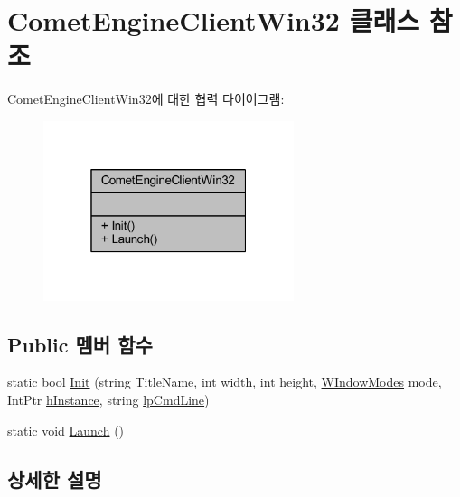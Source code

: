 \hypertarget{class_comet_engine_1_1_client_1_1_comet_engine_client_win32}{}\section{Comet\+Engine\+Client\+Win32 클래스 참조}
\label{class_comet_engine_1_1_client_1_1_comet_engine_client_win32}


Comet\+Engine\+Client\+Win32에 대한 협력 다이어그램\+:\nopagebreak
\begin{figure}[H]
\begin{center}
\leavevmode
\includegraphics[width=208pt]{class_comet_engine_1_1_client_1_1_comet_engine_client_win32__coll__graph}
\end{center}
\end{figure}
\subsection*{Public 멤버 함수}
\begin{DoxyCompactItemize}
\item 
static bool \hyperlink{class_comet_engine_1_1_client_1_1_comet_engine_client_win32_abc8d29bb16fdbea97c69b9cb6164e3df}{Init} (string Title\+Name, int width, int height, \hyperlink{namespace_comet_engine_1_1_client_a608d2e459fd95babca189e50f4182a65}{W\+Indow\+Modes} mode, Int\+Ptr \hyperlink{_d_l_l_comet_engine_win32_8cpp_a5fb685beb2aed3ecdbad03b352111398}{h\+Instance}, string \hyperlink{_d_l_l_comet_engine_win32_8cpp_af1ff5ad877f6069d41720b03c7769227}{lp\+Cmd\+Line})
\item 
static void \hyperlink{class_comet_engine_1_1_client_1_1_comet_engine_client_win32_aee7b13887a71ba1fcd42c5fbccf124d4}{Launch} ()
\end{DoxyCompactItemize}


\subsection{상세한 설명}


